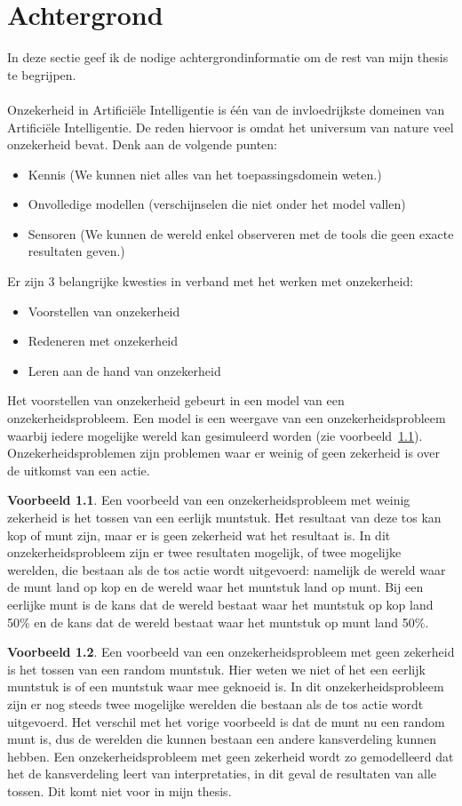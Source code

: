 \documentclass[12pt,a4paper,oneside]{book}
\theoremstyle{definition}
\newtheorem{exmp}{Voorbeeld}[section]
\begin{document}
\chapter{Achtergrond}
In deze sectie geef ik de nodige achtergrondinformatie om de rest van mijn thesis te begrijpen.
\\\\
Onzekerheid in Artifici\"{e}le Intelligentie is \'{e}\'{e}n van de invloedrijkste domeinen van Artifici\"{e}le Intelligentie. De reden hiervoor is omdat het universum van nature veel onzekerheid bevat. Denk aan de volgende punten:
\begin{itemize}
	\item Kennis (We kunnen niet alles van het toepassingsdomein weten.)
	\item Onvolledige modellen (verschijnselen die niet onder het model vallen)
	\item Sensoren (We kunnen de wereld enkel observeren met de tools die geen exacte resultaten geven.)
\end{itemize}
Er zijn 3 belangrijke kwesties in verband met het werken met onzekerheid:
\begin{itemize}
	\item Voorstellen van onzekerheid
	\item Redeneren met onzekerheid
	\item Leren aan de hand van onzekerheid
\end{itemize}
Het voorstellen van onzekerheid gebeurt in een model van een onzekerheidsprobleem. Een model is een weergave van een onzekerheidsprobleem waarbij iedere mogelijke wereld kan gesimuleerd worden (zie voorbeeld~\ref{exmp:faircoin}). Onzekerheidsproblemen zijn problemen waar er weinig of geen zekerheid is over de uitkomst van een actie. 
\begin{exmp}
\label{exmp:faircoin}
Een voorbeeld van een onzekerheidsprobleem met weinig zekerheid is het tossen van een eerlijk muntstuk. Het resultaat van deze tos kan kop of munt zijn, maar er is geen zekerheid wat het resultaat is. In dit onzekerheidsprobleem zijn er twee resultaten mogelijk, of twee mogelijke werelden, die bestaan als de tos actie wordt uitgevoerd: namelijk de wereld waar de munt land op kop en de wereld waar het muntstuk land op munt. Bij een eerlijke munt is de kans dat de wereld bestaat waar het muntstuk op kop land 50\% en de kans dat de wereld bestaat waar het muntstuk op munt land 50\%.
\end{exmp}
\begin{exmp}
Een voorbeeld van een onzekerheidsprobleem met geen zekerheid is het tossen van een random muntstuk. Hier weten we niet of het een eerlijk muntstuk is of een muntstuk waar mee geknoeid is. In dit onzekerheidsprobleem zijn er nog steeds twee mogelijke werelden die bestaan als de tos actie wordt uitgevoerd. Het verschil met het vorige voorbeeld is dat de munt nu een random munt is, dus de werelden die kunnen bestaan een andere kansverdeling kunnen hebben. Een onzekerheidsprobleem met geen zekerheid wordt zo gemodelleerd dat het de kansverdeling leert van interpretaties, in dit geval de resultaten van alle tossen. Dit komt niet voor in mijn thesis.
\end{exmp}
\end{document}
